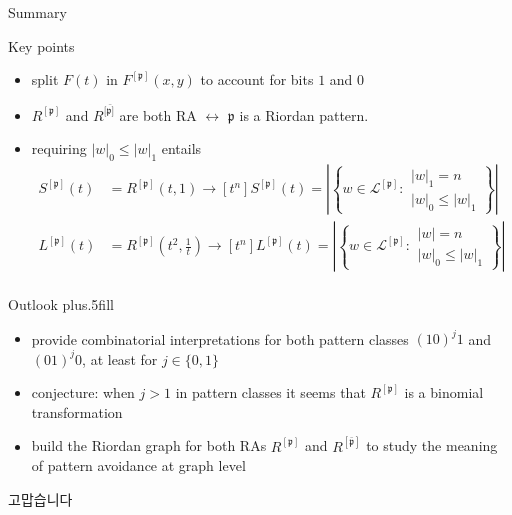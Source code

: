 \documentclass{beamer}
\begin{document}
\begin{frame}{Summary}

  \begin{block}{Key points}
      \begin{itemize}
      \item split $F(t)$ in $F^{[\mathfrak{p}]}(x,y)$ to account for bits $1$ and $0$
      \item ${{R}^{[\mathfrak{p}]}}$ and ${{R}^{[\bar{\mathfrak{p}]}}}$ are both RA
      $\leftrightarrow$  $\mathfrak{p}$ is a Riordan pattern.
      \item requiring $|w|_{0}\leq|w|_{1}$ entails
          \begin{displaymath}
          \begin{split}
          S^{[\mathfrak{p}]}(t)&=R^{[\mathfrak{p}]}(t,1)\rightarrow 
            [t^{n}]S^{[\mathfrak{p}]}(t)= \left|\left\lbrace w \in  \mathcal{L}^{[\mathfrak{p}]}:
                \begin{array}{l} |w|_{1} = n \\ |w|_{0}\leq|w|_{1} \end{array}\right\rbrace\right|\\
          L^{[\mathfrak{p}]}(t)&=R^{[\mathfrak{p}]}\left(t^2,\frac{1}{t}\right)\rightarrow
            [t^{n}]L^{[\mathfrak{p}]}(t)= \left|\left\lbrace w \in  \mathcal{L}^{[\mathfrak{p}]}:
                \begin{array}{l} |w| = n \\ |w|_{0}\leq|w|_{1} \end{array}\right\rbrace\right|\\
          \end{split}
          \end{displaymath}
      \end{itemize}
  \end{block}
\end{frame}
  
\begin{frame}{Outlook}
  \vskip0pt plus.5fill
    \begin{itemize}
    \item provide combinatorial interpretations for both pattern classes $(10)^{j}1$ and
    $(01)^{j}0$, at least for $j\in \lbrace 0,1 \rbrace$
    \item conjecture: when $j > 1$ in pattern classes it seems that $R^{[\mathfrak{p}]}$ is
    a binomial transformation
    \item build the Riordan graph for both RAs $R^{[\mathfrak{p}]}$ and $R^{[\bar{\mathfrak{p}}]}$
        to study the meaning of pattern avoidance at graph level
    \end{itemize}
\end{frame}

\begin{frame}{ }
\begin{CJK}{UTF8}{mj}
\Huge 고맙습니다
\end{CJK}
\end{frame}
\end{document}
